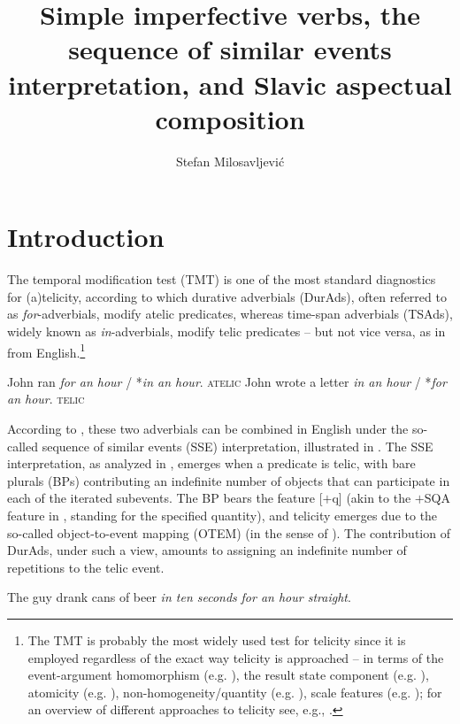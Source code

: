 \documentclass[output=paper,colorlinks,citecolor=brown]{langscibook}
\author{Stefan Milosavljević\affiliation{University of Graz}\orcid{0000-0003-2305-2519}}
\title[The sequence of similar events interpretation in Slavic]{Simple imperfective verbs, the sequence of similar events interpretation, and Slavic aspectual composition}
\begin{document}
\maketitle


\section{Introduction} 
The temporal modification test (TMT) is one of the most standard diagnostics for (a)telicity, according to which durative adverbials (DurAds), often referred to as \textit{for}-adverbials, modify atelic predicates, whereas time-span adverbials (TSAds), widely known as \textit{in}-adverbials, modify telic predicates -- but not vice versa, as in  from English.\footnote{The TMT is probably the most widely used test for telicity since it is employed regardless of the exact way telicity is approached -- in terms of the event-argument homomorphism (e.g. \citealt{Dowty1991, Krifka1992, Krifka1992}), the result state component (e.g. \citealt{Pustejovsky1995}), atomicity (e.g. \citealt{Rothstein2008a, Rothstein2008b}), non-homogeneity/quantity (e.g. \citealt{Borer_2005}), scale features (e.g. \citealt{Hayetal1999}); for an overview of different approaches to telicity see, e.g., \citet{ArsenijevicMarin2013}.} 

\ea \label{mil:ex:TMT}
\ea John ran \textit{for an hour} / *\textit{in an hour}. \hfill \textsc{atelic}
\ex John wrote a letter \textit{in an hour} / *\textit{for an hour}.       \hfill \textsc{telic}
\z
\z

\noindent According to \citet{MacDonald_2008}, these two adverbials can be combined in English under the so-called sequence of similar events (SSE) interpretation, illustrated in . The SSE interpretation, as analyzed in \citet{MacDonald_2008}, emerges when a predicate is telic, with bare plurals (BPs) contributing an indefinite number of objects that can participate in each of the iterated subevents. The BP bears the feature [$+$q] (akin to the $+$SQA feature in \citealt{Verkuyl_1972, Verkuyl1999}, standing for the specified quantity), and telicity emerges due to the so-called object-to-event mapping (OTEM) (in the sense of \citealt{Verkuyl_1972}). The contribution of DurAds, under such a view, amounts to assigning an indefinite number of repetitions to the telic event.

\ea \label{mil:ex:in+for}
The guy drank cans of beer \textit{in ten seconds} \textit{for an hour straight}.
\z 
\end{document}
